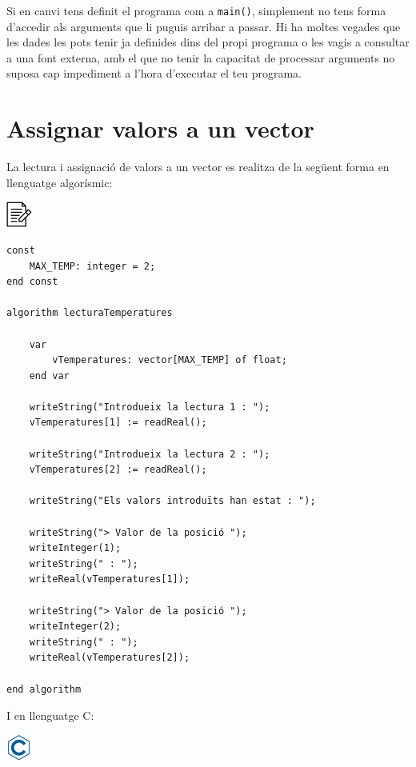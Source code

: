 \documentclass[]{book}
\begin{document}
Si en canvi tens definit el programa com a \texttt{main()}, simplement no tens forma d'accedir als arguments que li puguis arribar a passar. Hi ha moltes vegades que les dades les pots tenir ja definides dins del propi programa o les vagis a consultar a una font externa, amb el que no tenir la capacitat de processar arguments no suposa cap impediment a l'hora d'executar el teu programa.

\hypertarget{assignar-valors-a-un-vector}{%
\section{Assignar valors a un vector}\label{assignar-valors-a-un-vector}}

La lectura i assignació de valors a un vector es realitza de la següent forma en llenguatge algorísmic:

\includegraphics{./img/alg.png}

\begin{verbatim}
const
    MAX_TEMP: integer = 2;
end const

algorithm lecturaTemperatures

    var
        vTemperatures: vector[MAX_TEMP] of float;
    end var

    writeString("Introdueix la lectura 1 : ");
    vTemperatures[1] := readReal();

    writeString("Introdueix la lectura 2 : ");
    vTemperatures[2] := readReal();
    
    writeString("Els valors introduïts han estat : ");
    
    writeString("> Valor de la posició ");
    writeInteger(1);
    writeString(" : ");
    writeReal(vTemperatures[1]);
    
    writeString("> Valor de la posició ");
    writeInteger(2);
    writeString(" : ");
    writeReal(vTemperatures[2]);

end algorithm
\end{verbatim}

I en llenguatge C:

\includegraphics{./img/c.png}
\end{document}
